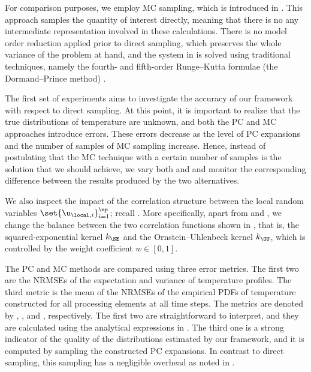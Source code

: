 For comparison purposes, we employ \ac{MC} sampling, which is introduced in
. This approach samples the quantity of interest directly, meaning
that there is no any intermediate representation involved in these calculations.
There is no model order reduction applied prior to direct sampling, which
preserves the whole variance of the problem at hand, and the system in
 is solved using traditional techniques, namely
the fourth- and fifth-order Runge--Kutta formulae (the Dormand--Prince method)
\cite{press2007}.


The first set of experiments aims to investigate the accuracy of our framework
with respect to direct sampling. At this point, it is important to realize that
the true distributions of temperature are unknown, and both the \ac{PC} and
\ac{MC} approaches introduce errors. These errors decrease as the level \lc of
\ac{PC} expansions and the number of samples \no of \ac{MC} sampling increase.
Hence, instead of postulating that the \ac{MC} technique with a certain number
of samples is the solution that we should achieve, we vary both \lc and \no and
monitor the corresponding difference between the results produced by the two
alternatives.

We also inspect the impact of the correlation structure between the local random
variables $\set{\u_{\local, i}}_{i = 1}^\np$; recall
. More specifically, apart from \lc and \no,
we change the balance between the two correlation functions shown in
, that is, the squared-exponential kernel $k_\SE$ and
the Ornstein--Uhlenbeck kernel $k_\OU$, which is controlled by the weight
coefficient $w \in [0, 1]$.

The \ac{PC} and \ac{MC} methods are compared using three error metrics. The
first two are the \acp{NRMSE} of the expectation and variance of temperature
profiles. The third metric is the mean of the \acp{NRMSE} of the empirical
\acp{PDF} of temperature constructed for all processing elements at all time
steps. The metrics are denoted by \error{\expectation}, \error{\variance}, and
, respectively. The first two are straightforward to interpret, and
they are calculated using the analytical expressions in .
The third one is a strong indicator of the quality of the distributions
estimated by our framework, and it is computed by sampling the constructed
\ac{PC} expansions. In contrast to direct sampling, this sampling has a
negligible overhead as noted in .

